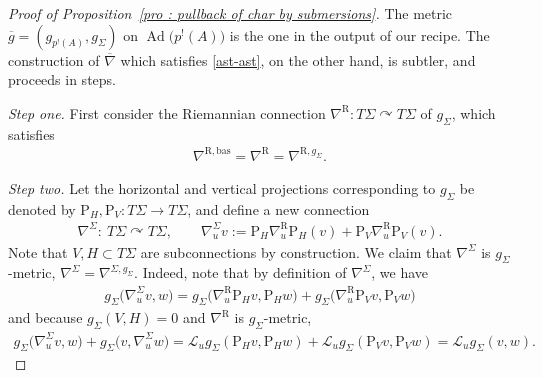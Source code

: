 \documentclass[pdftex]{sigma}
\numberwithin{equation}{section}
\newcommand{\acts}{\curvearrowright}
\newcommand{\8}{\infty}
\begin{document}
\begin{proof}[Proof of Proposition~\ref{pro : pullback of char by submersions}]
 The metric $\overline{g}=(g_{p^!(A)},g_{\Sigma})$ on $\operatorname{Ad}\big(p^!(A)\big)$ is the one in the output of our recipe. The construction of $\overline{\nabla}$ which satisfies \eqref{ast-ast}, on the other hand, is subtler, and proceeds in steps.

{\it Step one.} First consider the Riemannian connection $\nabla^{\mathrm{R}}\colon T\Sigma \acts T\Sigma$ of $g_{\Sigma}$, which satisfies
 \begin{gather*}
 \nabla^{\mathrm{R},\mathrm{bas}} = \nabla^{\mathrm{R}} = \nabla^{\mathrm{R},g_{\Sigma}}.
 \end{gather*}

{\it Step two.} Let the horizontal and vertical projections corresponding to $g_{\Sigma}$ be denoted by $\mathrm{P}_H,\mathrm{P}_V\colon T\Sigma \to T\Sigma $, and define a new connection
 \begin{gather*}
 \nabla^{\Sigma}\colon \ T\Sigma \acts T\Sigma, \qquad \nabla^{\Sigma}_uv:=\mathrm{P}_H\nabla^{\mathrm{R}}_u\mathrm{P}_H(v) + \mathrm{P}_V\nabla^{\mathrm{R}}_u\mathrm{P}_V(v).
 \end{gather*}Note that $V,H \subset T\Sigma$ are subconnections by construction. We claim that $\nabla^{\Sigma}$ is $g_{\Sigma}$-metric, $\nabla^{\Sigma} = \nabla^{\Sigma,g_{\Sigma}}$. Indeed, note that by definition of $\nabla^{\Sigma}$, we have
 \begin{gather*}
 g_{\Sigma}\big(\nabla^{\Sigma}_uv,w\big) = g_{\Sigma}\big(\nabla^{\mathrm{R}}_u\mathrm{P}_Hv,\mathrm{P}_Hw\big) + g_{\Sigma}\big(\nabla^{\mathrm{R}}_u\mathrm{P}_Vv,\mathrm{P}_Vw\big)
 \end{gather*}and because $g_{\Sigma}(V,H)=0$ and $\nabla^{\mathrm{R}}$ is $g_{\Sigma}$-metric,
 \begin{gather*}
 g_{\Sigma}\big(\nabla^{\Sigma}_uv,w\big) + g_{\Sigma}\big(v,\nabla^{\Sigma}_uw\big) = \mathscr{L}_ug_{\Sigma}(\mathrm{P}_Hv,\mathrm{P}_Hw) + \mathscr{L}_ug_{\Sigma}(\mathrm{P}_Vv,\mathrm{P}_Vw) = \mathscr{L}_ug_{\Sigma}(v,w).
 \end{gather*}


\end{proof}
\end{document}
